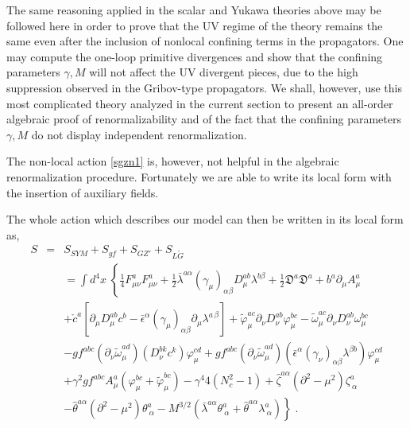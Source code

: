 The same reasoning applied in the scalar and Yukawa theories above may be followed here in order to prove that the UV regime of the theory remains the same even after the inclusion of nonlocal confining terms in the propagators. One may compute the one-loop primitive divergences and show that the confining parameters $\gamma,M$ will not affect the UV divergent pieces, due to the high suppression observed in the Gribov-type propagators. We shall, however, use this most complicated theory analyzed in the current section to present an all-order algebraic proof of renormalizability and of the fact that the confining parameters $\gamma,M$ do not display independent renormalization.

\noindent The non-local action \eqref{sgzn1} is, however, not helpful in the algebraic renormalization procedure. Fortunately we are able to write its local form with the insertion of auxiliary fields. 

\noindent The whole action which describes our model can then be written in its local form as, 
\begin{eqnarray}
\label{fnlact1}
S &=& S_{SYM} + S_{gf} + S_{GZ'} + S_{L\tilde{G}}\nonumber \\
&&
=\int d^{4}x\; \left\{\frac{1}{4}F^{a}_{\mu \nu}F^{a}_{\mu\nu} 
+ \frac{1}{2} \bar{\lambda}^{a\alpha} (\gamma_{\mu})_{\alpha\beta} D^{ab}_{\mu}\lambda^{b\beta}
+ \frac{1}{2}\mathfrak{D}^a\mathfrak{D}^a 
+ b^{a}\partial_{\mu}A^{a}_{\mu} \right. \nonumber\\
&&
+\check{c}^{a}\left[\partial_{\mu}D^{ab}_{\mu}c^{b}
-\bar{\epsilon}^{\alpha}(\gamma_{\mu})_{\alpha\beta}\partial_{\mu}\lambda^{a\,\beta}\right]
+ \tilde{\varphi}^{ac}_{\mu}\partial_{\nu}D_{\nu}^{ab}\varphi^{bc}_{\mu} 
-\tilde{\omega}^{ac}_{\mu}\partial_{\nu}D_{\nu}^{ab}\omega^{bc}_{\mu} \nonumber \\
&&
-gf^{abc}(\partial_{\nu}\tilde{\omega}^{ad}_{\mu})(D^{bk}_{\nu}c^{k})\varphi^{cd}_{\mu}
+gf^{abc}(\partial_{\nu}\tilde{\omega}^{ad}_{\mu})(\bar{\epsilon}^\alpha(\gamma_\nu)_{\alpha\beta}\lambda^{\beta b})\varphi^{cd}_{\mu} \nonumber \\
&&
+\gamma^{2}gf^{abc}A^{a}_{\mu}(\varphi^{bc}_{\mu} + \tilde{\varphi}^{bc}_{\mu}) 
-\gamma^{4}4(N_{c}^{2}-1) 
+\hat{\zeta}^{a\alpha} (\partial^{2} - \mu^{2})\zeta^{a}_{~\alpha} \nonumber \\
&&
\left.
-\hat{\theta}^{a\alpha}(\partial^{2} - \mu^{2})\theta^{a}_{~\alpha} 
-M^{3/2}(\bar{\lambda}^{a\alpha}\theta^{a}_{~\alpha} 
+\hat{\theta}^{a\alpha}\lambda^{a}_{~\alpha})
\right\}\;.
\label{thSYM}
\end{eqnarray} 

